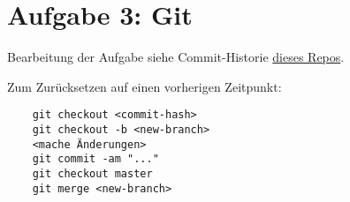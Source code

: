 \documentclass[11pt,a4paper]{scrartcl}
\begin{document}
\section{Aufgabe 3: Git}
Bearbeitung der Aufgabe siehe Commit-Historie
\href{https://github.com/jerluebke/homework}{dieses Repos}. \par\noindent
Zum Zurücksetzen auf einen vorherigen Zeitpunkt:
\begin{verbatim}
    git checkout <commit-hash>
    git checkout -b <new-branch>
    <mache Änderungen>
    git commit -am "..."
    git checkout master
    git merge <new-branch>
\end{verbatim}

\printbibliography[title=Literaturverzeichnis]
\end{document}
